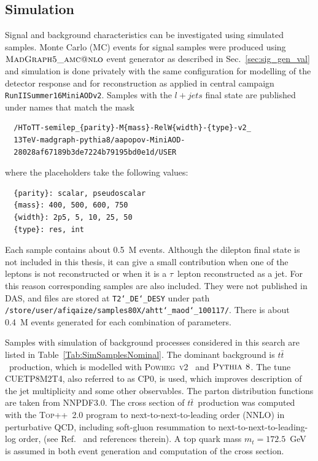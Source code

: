 \subsection{Simulation}
%
Signal and background characteristics can be investigated using simulated samples.
Monte Carlo (MC) events for signal samples were produced using $\textsc{MadGraph5\_amc@nlo}$ event generator as described in Sec.~\ref{sec:sig_gen_val} and simulation is done privately with the same configuration for modelling of the detector response and for reconstruction as applied in central campaign \texttt{RunIISummer16MiniAODv2}.
Samples with the $l+jets$ final state are published under names that match the mask
\begin{verbatim}
  /HToTT-semilep_{parity}-M{mass}-RelW{width}-{type}-v2_
  13TeV-madgraph-pythia8/aapopov-MiniAOD-
  28028af67189b3de7224b79195bd0e1d/USER
\end{verbatim}
where the placeholders take the following values:
\begin{verbatim}
  {parity}: scalar, pseudoscalar
  {mass}: 400, 500, 600, 750
  {width}: 2p5, 5, 10, 25, 50
  {type}: res, int
\end{verbatim}
Each sample contains about 0.5~M events.
Although the dilepton final state is not included in this thesis, it can give a small contribution when one of the leptons is not reconstructed or when it is a $\tau$~lepton reconstructed as a jet.
For this reason corresponding samples are also included.
They were not published in DAS, and files are stored at \texttt{T2\char`_DE\char`_DESY} under path \texttt{/store/user/afiqaize/samples80X/ahtt\char`_maod\char`_100117/}.
There is about 0.4~M events generated for each combination of parameters.

Samples with simulation of background processes considered in this search are listed in Table~\ref{Tab:SimSamplesNominal}.
The dominant background is $t\bar t$~production, which is modelled with \textsc{Powheg~v2}~\cite{Nason:2004rx} and $\textsc{Pythia~8}$.
The tune CUETP8M2T4, also referred to as CP0, is used, which improves description of the jet multiplicity and some other observables.
The parton distribution functions are taken from NNPDF3.0.
The cross section of $t\bar t$~production was computed with the \textsc{Top++~2.0} program to next-to-next-to-leading order (NNLO) in perturbative QCD, including soft-gluon resummation to next-to-next-to-leading-log order, (see Ref.~\cite{Czakon:top_pp} and references therein).
A top quark mass $m_{t} = 172.5$~GeV is assumed in both event generation and computation of the cross section.

